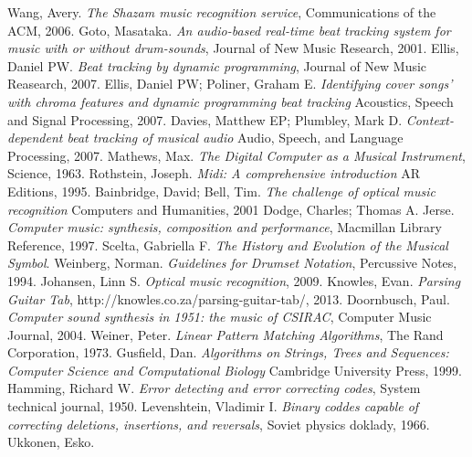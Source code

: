 \documentclass[12pt,twoside,notitlepage]{report}
\begin{document}

\begin{thebibliography}{99}
	Wang, Avery.
	\emph{The Shazam music recognition service},
	Communications of the ACM,
	2006.
	Goto, Masataka.
	\emph{An audio-based real-time beat tracking system for music with or without drum-sounds},
	Journal of New Music Research,
	2001.
	Ellis, Daniel PW.
	\emph{Beat tracking by dynamic programming},
	Journal of New Music Reasearch,
	2007.
	Ellis, Daniel PW; Poliner, Graham E.
	\emph{Identifying cover songs' with chroma features and dynamic programming beat tracking}
	Acoustics, Speech and Signal Processing,
	2007.
	Davies, Matthew EP; Plumbley, Mark D.
	\emph{Context-dependent beat tracking of musical audio}
	Audio, Speech, and Language Processing,
	2007.
	Mathews, Max.
	\emph{The Digital Computer as a Musical Instrument},
	Science,
	1963.
	Rothstein, Joseph.
	\emph{Midi: A comprehensive introduction}
	AR Editions,
	1995.
	Bainbridge, David; Bell, Tim.
	\emph{The challenge of optical music recognition}
	Computers and Humanities,
	2001
	Dodge, Charles; Thomas A. Jerse.
	\emph{Computer music: synthesis, composition and performance},
	Macmillan Library Reference, 
	1997.
	Scelta, Gabriella F.
	\emph{The History and Evolution of the Musical Symbol}.
	Weinberg, Norman.
	\emph{Guidelines for Drumset Notation},
	Percussive Notes,
	1994.
	Johansen, Linn S.
	\emph{Optical music recognition},
	2009.	
	Knowles, Evan.
	\emph{Parsing Guitar Tab},
	http://knowles.co.za/parsing-guitar-tab/,
	2013.
	Doornbusch, Paul.
	\emph{Computer sound synthesis in 1951: the music of CSIRAC},
	Computer Music Journal,
	2004.
	Weiner, Peter.
	\emph{Linear Pattern Matching Algorithms},
	The Rand Corporation,
	1973.
	Gusfield, Dan.
	\emph{Algorithms on Strings, Trees and Sequences: Computer Science and Computational Biology}
	Cambridge University Press,
	1999.
	Hamming, Richard W.
	\emph{Error detecting and error correcting codes},
	System technical journal,
	1950.
	Levenshtein, Vladimir I.
	\emph{Binary coddes capable of correcting deletions, insertions, and reversals},
	Soviet physics doklady,
	1966.
	Ukkonen, Esko.

\end{thebibliography}
\end{document}
